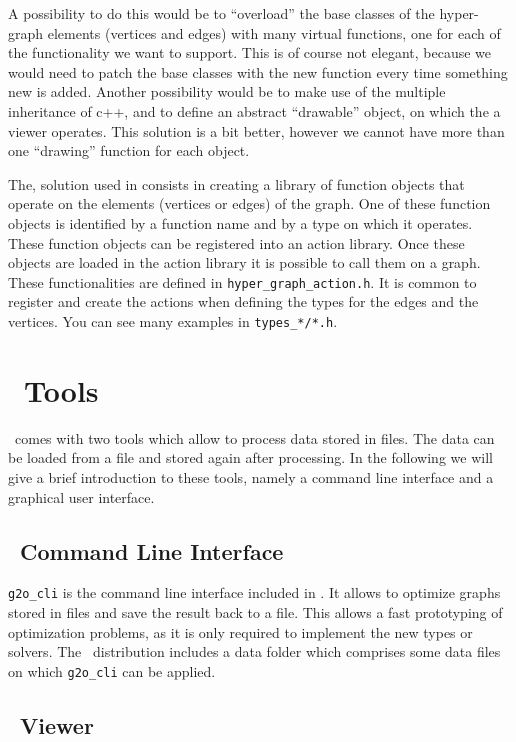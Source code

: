 \documentclass[a4paper]{article}
\begin{document}
A possibility to do this would be to ``overload'' the base classes of
the hyper-graph elements (vertices and edges) with many virtual
functions, one for each of the functionality we want to support.  This
is of course not elegant, because we would need to patch the base
classes with the new function every time something new is added.
Another possibility would be to make use of the multiple inheritance
of c++, and to define an abstract ``drawable'' object, on which the a
viewer operates.  This solution is a bit better, however we cannot
have more than one ``drawing'' function for each object.

The, solution used in \gopt{} consists in creating a library of
function objects that operate on the elements (vertices or edges) of
the graph.  One of these function objects is identified by a function
name and by a type on which it operates.  These function objects can
be registered into an action library.  Once these objects are loaded
in the action library it is possible to call them on a graph.  These
functionalities are defined in \verb+hyper_graph_action.h+.  It is
common to register and create the actions when defining the types for
the edges and the vertices.  You can see many examples in
\verb+types_*/*.h+.

\section{\gopt\ Tools}
\gopt\ comes with two tools which allow to process data stored in
files. The data can be loaded from a file and stored again after
processing. In the following we will give a brief introduction to these
tools, namely a command line interface and a graphical user interface.

\subsection{\gopt\ Command Line Interface}

\verb+g2o_cli+ is the command line interface included in \gopt. It
allows to optimize graphs stored in files and save the result back to a
file. This allows a fast prototyping of optimization problems, as it is
only required to implement the new types or solvers. The \gopt\
distribution includes a data folder which comprises some data files on
which \verb+g2o_cli+ can be applied.

\subsection{\gopt\ Viewer}
\end{document}
